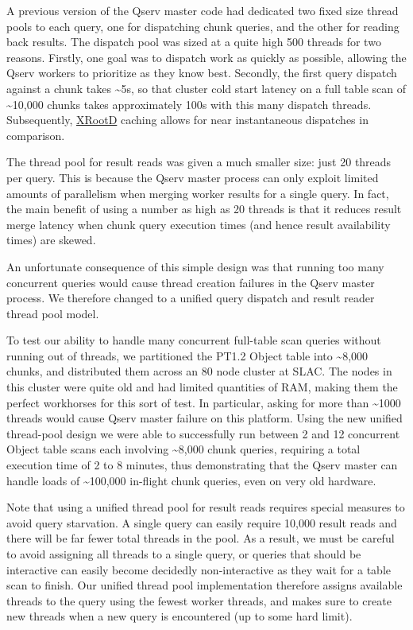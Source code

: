 \documentclass[DM,lsstdraft,toc]{lsstdoc}
\begin{document}
A previous version of the Qserv master code had dedicated two fixed size
thread pools to each query, one for dispatching chunk queries, and the
other for reading back results. The dispatch pool was sized at a quite
high 500 threads for two reasons. Firstly, one goal was to dispatch work
as quickly as possible, allowing the Qserv workers to prioritize as they
know best. Secondly, the first query dispatch against a chunk takes
\textasciitilde{}5s, so that cluster cold start latency on a full table
scan of \textasciitilde{}10,000 chunks takes approximately 100s with
this many dispatch threads. Subsequently,
\href{http://xrootd.org}{XRootD} caching allows for near instantaneous
dispatches in comparison.

The thread pool for result reads was given a much smaller size: just 20
threads per query. This is because the Qserv master process can only
exploit limited amounts of parallelism when merging worker results for a
single query. In fact, the main benefit of using a number as high as 20
threads is that it reduces result merge latency when chunk query
execution times (and hence result availability times) are skewed.

An unfortunate consequence of this simple design was that running too
many concurrent queries would cause thread creation failures in the
Qserv master process. We therefore changed to a unified query dispatch
and result reader thread pool model.

To test our ability to handle many concurrent full-table scan queries
without running out of threads, we partitioned the PT1.2 Object table
into \textasciitilde{}8,000 chunks, and distributed them across an 80
node cluster at SLAC. The nodes in this cluster were quite old and had
limited quantities of RAM, making them the perfect workhorses for this
sort of test. In particular, asking for more than \textasciitilde{}1000
threads would cause Qserv master failure on this platform. Using the new
unified thread-pool design we were able to successfully run between 2
and 12 concurrent Object table scans each involving
\textasciitilde{}8,000 chunk queries, requiring a total execution time
of 2 to 8 minutes, thus demonstrating that the Qserv master can handle
loads of \textasciitilde{}100,000 in-flight chunk queries, even on very
old hardware.

Note that using a unified thread pool for result reads requires special
measures to avoid query starvation. A single query can easily require
10,000 result reads and there will be far fewer total threads in the
pool. As a result, we must be careful to avoid assigning all threads to
a single query, or queries that should be interactive can easily become
decidedly non-interactive as they wait for a table scan to finish. Our
unified thread pool implementation therefore assigns available threads
to the query using the fewest worker threads, and makes sure to create
new threads when a new query is encountered (up to some hard limit).
\end{document}
